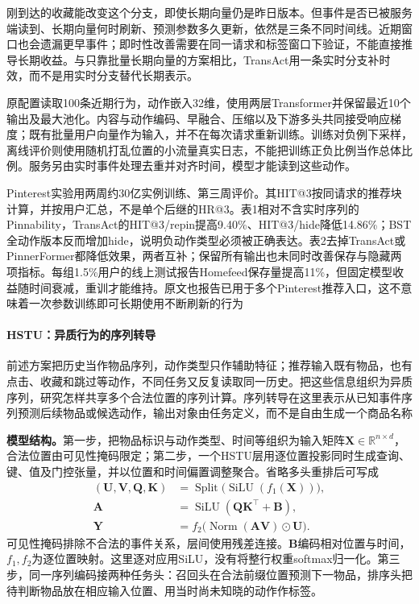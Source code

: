 刚到达的收藏能改变这个分支，即使长期向量仍是昨日版本。但事件是否已被服务端读到、长期向量何时刷新、预测参数多久更新，依然是三条不同时间线。近期窗口也会遗漏更早事件；即时性改善需要在同一请求和标签窗口下验证，不能直接推导长期收益。与只靠批量长期向量的方案相比，TransAct用一条实时分支补时效，而不是用实时分支替代长期表示。

原配置读取100条近期行为，动作嵌入32维，使用两层Transformer并保留最近10个输出及最大池化。内容与动作编码、早融合、压缩以及下游多头共同接受响应梯度；既有批量用户向量作为输入，并不在每次请求重新训练。训练对负例下采样，离线评价则使用随机打乱位置的小流量真实日志，不能把训练正负比例当作总体比例。服务另由实时事件处理去重并对齐时间，模型才能读到这些动作。

Pinterest实验用两周约30亿实例训练、第三周评价。其HIT@3按同请求的推荐块计算，并按用户汇总，不是单个后继的HR@3。表1相对不含实时序列的Pinnability，TransAct的HIT@3/repin提高9.40\%、HIT@3/hide降低14.86\%；BST全动作版本反而增加hide，说明负动作类型必须被正确表达。表2去掉TransAct或PinnerFormer都降低效果，两者互补；保留所有输出也未同时改善保存与隐藏两项指标。每组1.5\%用户的线上测试报告Homefeed保存量提高11\%，但固定模型收益随时间衰减，重训才能维持。原文也报告已用于多个Pinterest推荐入口，这不意味着一次参数训练即可长期使用不断刷新的行为

\paragraph{HSTU：异质行为的序列转导}
\label{sec:rs-hstu}

前述方案把历史当作物品序列，动作类型只作辅助特征；推荐输入既有物品，也有点击、收藏和跳过等动作，不同任务又反复读取同一历史。把这些信息组织为异质序列，研究怎样共享多个合法位置的序列计算。序列转导在这里表示从已知事件序列预测后续物品或候选动作，输出对象由任务定义，而不是自由生成一个商品名称

\textbf{模型结构。}第一步，把物品标识与动作类型、时间等组织为输入矩阵$\bm{X}\in\mathbb{R}^{n\times d}$，合法位置由可见性掩码限定；第二步，一个HSTU层用逐位置投影同时生成查询、键、值及门控张量，并以位置和时间偏置调整聚合。省略多头重排后可写成
\begin{align}
  (\bm{U},\bm{V},\bm{Q},\bm{K})
    &=\operatorname{Split}\bigl(\operatorname{SiLU}(f_1(\bm{X}))\bigr),\\
  \bm{A}&=\operatorname{SiLU}(\bm{Q}\bm{K}^{\top}+\bm{B}),\\
  \bm{Y}&=f_2\bigl(\operatorname{Norm}(\bm{A}\bm{V})\odot\bm{U}\bigr).
  \label{eq:rs-hstu}
\end{align}
可见性掩码排除不合法的事件关系，层间使用残差连接。$\bm{B}$编码相对位置与时间，$f_1,f_2$为逐位置映射。这里逐对应用SiLU，没有将整行权重softmax归一化。第三步，同一序列编码接两种任务头：召回头在合法前缀位置预测下一物品，排序头把待判断物品放在相应输入位置、用当时尚未知晓的动作作标签。

